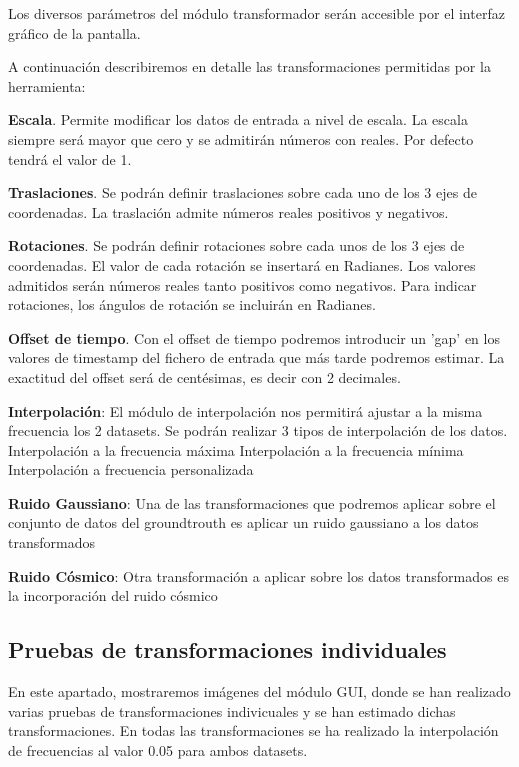 Los diversos parámetros del módulo transformador serán accesible por el interfaz gráfico de la pantalla.

A continuación describiremos en detalle las transformaciones permitidas por la herramienta:

\textbf{Escala}. Permite modificar los datos de entrada a nivel de escala. La escala siempre será mayor que cero y se admitirán números con reales. Por defecto tendrá el valor de 1. 

\textbf{Traslaciones}. Se podrán definir traslaciones sobre cada uno de los 3 ejes de coordenadas. 
La traslación admite números reales positivos y negativos.

\textbf{Rotaciones}. Se podrán definir rotaciones sobre cada unos de los 3 ejes de coordenadas. El valor de cada rotación se insertará en Radianes. Los valores admitidos serán números reales tanto positivos como negativos. Para indicar rotaciones, los ángulos de rotación se incluirán en Radianes.

\textbf{Offset de tiempo}. Con el offset de tiempo podremos introducir un 'gap' en los valores de timestamp del fichero de entrada que más tarde podremos estimar. La exactitud del offset será de centésimas, es decir con 2 decimales.

\textbf{Interpolación}: El módulo de interpolación nos permitirá ajustar a la misma frecuencia los 2 datasets. Se podrán realizar 3 tipos de interpolación de los datos.
	Interpolación a la frecuencia máxima
	Interpolación a la frecuencia mínima
	Interpolación a frecuencia personalizada

\textbf{Ruido Gaussiano}: Una de las transformaciones que podremos aplicar sobre el conjunto de datos del groundtrouth es aplicar un ruido gaussiano a los datos transformados

\textbf{Ruido Cósmico}: Otra transformación a aplicar sobre los datos transformados es la incorporación del ruido cósmico


\subsection{Pruebas de transformaciones individuales}

En este apartado, mostraremos imágenes del módulo GUI, donde se han realizado varias pruebas de transformaciones indivicuales y se han estimado dichas transformaciones.
En todas las transformaciones se ha realizado la interpolación de frecuencias al valor 0.05 para ambos datasets.

